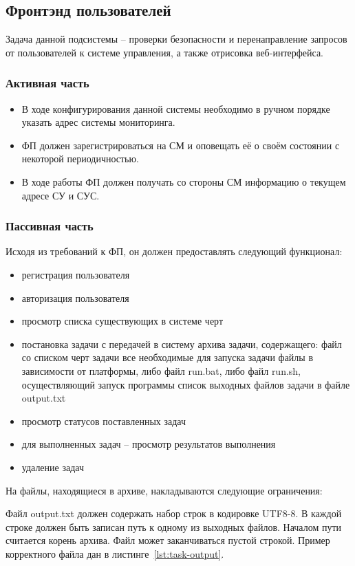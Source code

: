 \documentclass[a4paper,12pt]{report}
\numberwithin{equation}{section}
\begin{document}
\subsection{Фронтэнд пользователей}
Задача данной подсистемы -- проверки безопасности и перенаправление запросов от пользователей к системе управления, а также отрисовка веб-интерфейса.

\subsubsection{Активная часть}
\begin{itemize}
  \item В ходе конфигурирования данной системы необходимо в ручном порядке указать адрес системы мониторинга.
  \item ФП должен зарегистрироваться на СМ и оповещать её о своём состоянии с некоторой периодичностью.
  \item В ходе работы ФП должен получать со стороны СМ информацию о текущем адресе СУ и СУС.
\end{itemize}

\subsubsection{Пассивная часть}
Исходя из требований к ФП, он должен предоставлять следующий функционал:

\begin{itemize}
  \item регистрация пользователя
  \item авторизация пользователя
  \item просмотр списка существующих в системе черт
  \item постановка задачи с передачей в систему архива задачи, содержащего:
  \subitem файл со списком черт задачи
  \subitem все необходимые для запуска задачи файлы
  \subitem в зависимости от платформы, либо файл run.bat, либо файл run.sh, осуществляющий запуск программы
  \subitem список выходных файлов задачи в файле output.txt
  \item просмотр статусов поставленных задач
  \item для выполненных задач -- просмотр результатов выполнения
  \item удаление задач
\end{itemize}

На файлы, находящиеся в архиве, накладываются следующие ограничения:

Файл output.txt должен содержать набор строк в кодировке UTF8-8.
В каждой строке должен быть записан путь к одному из выходных файлов.
Началом пути считается корень архива.
Файл может заканчиваться пустой строкой.
Пример корректного файла дан в листинге~\ref{lst:task-output}.
\end{document}
